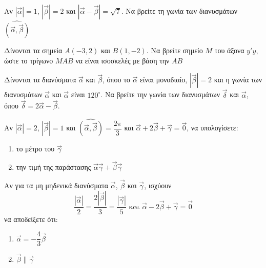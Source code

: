 \documentclass{../../presentation}
\begin{document}
\begin{askisi}
  Αν $|\vec{α}|=1$, $|\vec{β}|=2$ και $|\vec{α}-\vec{β}|=\sqrt{7}$. Να βρείτε τη γωνία των διανυσμάτων $\widehat{(\vec{α }, \vec{β })}$

\end{askisi}

\begin{askisi}
  Δίνονται τα σημεία $Α(-3,2)$ και $Β(1,-2)$. Να βρείτε σημείο $Μ$ του άξονα $y'y$, ώστε το τρίγωνο $ΜΑΒ$ να είναι ισοσκελές με βάση την $ΑΒ$

\end{askisi}

\begin{askisi}
  Δίνονται τα διανύσματα $\vec{α}$ και $\vec{β}$, όπου το $\vec{α}$ είναι μοναδιαίο, $|\vec{β}|=2$ και η γωνία των διανυσμάτων $\vec{α}$ και $\vec{α}$ είναι $120^{\circ}$. Να βρείτε την γωνία των διανυσμάτων $\vec{δ}$ και $\vec{α}$, όπου $\vec{δ}=2\vec{α}-\vec{β}$.

\end{askisi}

\begin{askisi}
  Αν $|\vec{α}|=2$, $|\vec{β}|=1$ και $\widehat{(\vec{α }, \vec{β })}=\dfrac{2\pi}{3}$ και $\vec{α}+2\vec{β}+\vec{γ}=\vec{0}$, να υπολογίσετε:
  \begin{enumerate}
    \item<1-> το μέτρο του $\vec{γ}$
    \item<2-> την τιμή της παράστασης $\vec{α}\vec{γ}+\vec{β}\vec{γ}$
  \end{enumerate}

\end{askisi}

\begin{askisi}
  Αν για τα μη μηδενικά διανύσματα $\vec{α}$, $\vec{β}$ και $\vec{γ}$, ισχύουν
  $$\dfrac{|\vec{α}|}{2}=\dfrac{2|\vec{β}|}{3}=\dfrac{|\vec{γ}|}{5} \text{ και } \vec{α}-2\vec{β}+\vec{γ}=\vec{0}$$
  να αποδείξετε ότι:
  \begin{enumerate}
    \item<1-> $\vec{α}=-\dfrac{4}{3}\vec{β}$
    \item<2-> $\vec{β}\parallel \vec{γ}$
  \end{enumerate}

\end{askisi}
\end{document}
